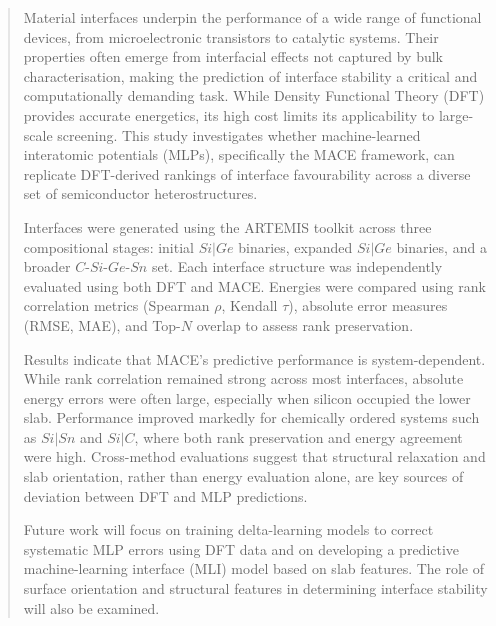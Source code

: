 \begin{abstract}
    Material interfaces underpin the performance of a wide range of functional devices, from microelectronic transistors to catalytic systems. Their properties often emerge from interfacial effects not captured by bulk characterisation, making the prediction of interface stability a critical and computationally demanding task. While Density Functional Theory (DFT) provides accurate energetics, its high cost limits its applicability to large-scale screening. This study investigates whether machine-learned interatomic potentials (MLPs), specifically the MACE framework, can replicate DFT-derived rankings of interface favourability across a diverse set of semiconductor heterostructures.

    Interfaces were generated using the ARTEMIS toolkit across three compositional stages: initial $Si|Ge$ binaries, expanded $Si|Ge$ binaries, and a broader $C$-$Si$-$Ge$-$Sn$ set. Each interface structure was independently evaluated using both DFT and MACE. Energies were compared using rank correlation metrics (Spearman $\rho$, Kendall $\tau$), absolute error measures (RMSE, MAE), and Top-$N$ overlap to assess rank preservation.

    Results indicate that MACE's predictive performance is system-dependent. While rank correlation remained strong across most interfaces, absolute energy errors were often large, especially when silicon occupied the lower slab. Performance improved markedly for chemically ordered systems such as $Si|Sn$ and $Si|C$, where both rank preservation and energy agreement were high. Cross-method evaluations suggest that structural relaxation and slab orientation, rather than energy evaluation alone, are key sources of deviation between DFT and MLP predictions.

    Future work will focus on training delta-learning models to correct systematic MLP errors using DFT data and on developing a predictive machine-learning interface (MLI) model based on slab features. The role of surface orientation and structural features in determining interface stability will also be examined.
\end{abstract}
